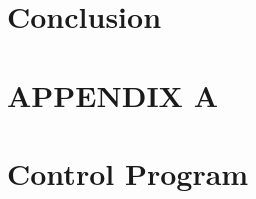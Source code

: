 \documentclass{article}
\begin{document}
\section{Conclusion}
\label{sec:conclusion}

%
%
 \newpage
\onecolumn
\appendix
\setcounter{table}{0}
\setcounter{figure}{0}
\setcounter{subsection}{0}
\makeatletter \renewcommand{\thefigure}{A.\@arabic\c@figure} \renewcommand{\thetable}{A.\@arabic\c@table} \renewcommand{\thesection}{A.\@arabic\c@section} \makeatother
\section*{APPENDIX A}

\section{Control Program}
%
 
\end{document}
